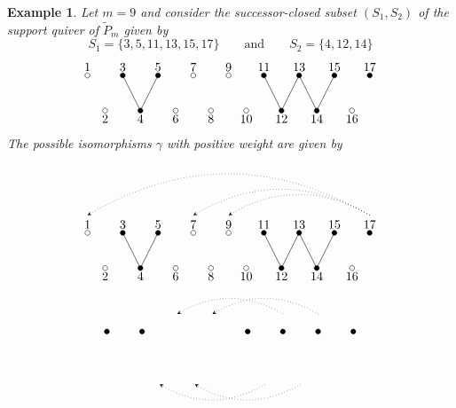 \documentclass{amsart}
\newtheorem{example}[theorem]{Example}
\numberwithin{equation}{section}
\begin{document}
    \begin{example}
      Let $m=9$ and consider the successor-closed subset $(S_1,S_2)$ of the support quiver of $\tilde P_m$ given by
      \[S_1=\{3,5,11,13,15,17\}\qquad\text{and}\qquad S_2=\{4,12,14\}\]
      \[
        \begin{tikzpicture}
          \foreach \i in {3,5,11,13,15,17}{
            \draw[fill=black] (0.5*\i,1) circle (2pt);
            \node[above] at (0.5*\i,1) {\i};}
          \foreach \i in {1,7,9}{
            \draw[fill=white] (0.5*\i,1) circle (2pt);
            \node[above] at (0.5*\i,1) {\i};}
          \foreach \i in {4,12,14}{
            \draw[fill=black] (0.5*\i,0) circle (2pt);
            \draw (0.5*\i,0) -- (0.5*\i-0.5,1);
            \draw (0.5*\i,0) -- (0.5*\i+0.5,1);
            \node[below] at (0.5*\i,0) {\i};}
          \foreach \i in {2,6,8,10,16}{
            \draw[fill=white] (0.5*\i,0) circle (2pt);
            \node[below] at (0.5*\i,0) {\i};}
        \end{tikzpicture}
      \]
      The possible isomorphisms $\gamma$ with positive weight are given by
      \[
        \begin{tikzpicture}
          \draw[dotted,-stealth] (8.5,1.5) to[out=150,in=30] (0.5,1.5);
          \draw[dotted,-stealth] (8.5,1.5) to[out=150,in=30] (3.5,1.5);
          \draw[dotted,-stealth] (8.5,1.5) to[out=150,in=30] (4.5,1.5);
          \foreach \i in {3,5,11,13,15,17}{
            \draw[fill=black] (0.5*\i,1) circle (2pt);
            \node[above] at (0.5*\i,1) {\i};}
          \foreach \i in {1,7,9}{
            \draw[fill=white] (0.5*\i,1) circle (2pt);
            \node[above] at (0.5*\i,1) {\i};}
          \foreach \i in {4,12,14}{
            \draw[fill=black] (0.5*\i,0) circle (2pt);
            \draw (0.5*\i,0) -- (0.5*\i-0.5,1);
            \draw (0.5*\i,0) -- (0.5*\i+0.5,1);
            \node[below] at (0.5*\i,0) {\i};}
          \foreach \i in {2,6,8,10,16}{
            \draw[fill=white] (0.5*\i,0) circle (2pt);
            \node[below] at (0.5*\i,0) {\i};}
        \end{tikzpicture}
      \]
      \[
        \begin{tikzpicture}
          \draw[dotted,-stealth] (6.5,1.5) to[out=150,in=30] (3.5,1.5);
          \draw[dotted,-stealth] (7.5,1.5) to[out=150,in=30] (4.5,1.5);
          \draw[dotted,-stealth] (6,-0.5) to[out=210,in=-30] (3,-0.5);
          \draw[dotted,-stealth] (7,-0.5) to[out=210,in=-30] (4,-0.5);
          \foreach \i in {3,5,11,13,15,17}{
            \draw[fill=black] (0.5*\i,1) circle (2pt);
}
\end{tikzpicture}\]
\end{example}
\end{document}
